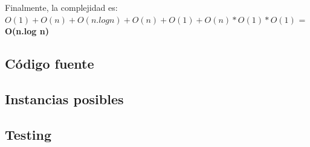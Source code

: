 Finalmente, la complejidad es: $O(1)+O(n)+O(n.log n)+O(n)+O(1)+O(n)*O(1)*O(1)$ = \textbf{O(n.log n)}

\subsection{Código fuente}



\subsection{Instancias posibles}



\subsection{Testing}
